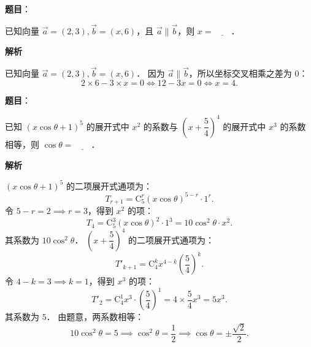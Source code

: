 \begin{answer}

\textbf{题目}：

已知向量 $\vec{a} = (2, 3), \vec{b} = (x, 6)$，且 $\vec{a} \parallel \vec{b}$，则 $x = \underline{\qquad}$．

\textbf{解析}

已知向量 $\vec{a} = (2, 3), \vec{b} = (x, 6)$．
因为 $\vec{a} \parallel \vec{b}$，所以坐标交叉相乘之差为 0：
\nopagebreak[4]
\[
2 \times 6 - 3 \times x = 0 \iff 12 - 3x = 0 \iff x = 4.
\]


\end{answer}
\begin{answer}

\textbf{题目}：

已知 $(x\cos\theta + 1)^5$ 的展开式中 $x^2$ 的系数与 $\left(x + \dfrac{5}{4}\right)^4$ 的展开式中 $x^3$ 的系数相等，则 $\cos\theta = \underline{\qquad}$．

\textbf{解析}

$(x\cos\theta + 1)^5$ 的二项展开式通项为：
\nopagebreak[4]
\[
T_{r+1} = \mathrm{C}_5^r (x\cos\theta)^{5-r} \cdot 1^r.
\]
令 $5 - r = 2 \implies r = 3$，得到 $x^2$ 的项：
\nopagebreak[4]
\[
T_4 = \mathrm{C}_5^3 (x\cos\theta)^2 \cdot 1^3 = 10 \cos^2\theta \cdot x^2.
\]
其系数为 $10\cos^2\theta$．
$\left(x + \dfrac{5}{4}\right)^4$ 的二项展开式通项为：
\nopagebreak[4]
\[
T'_{k+1} = \mathrm{C}_4^k x^{4-k} \left(\frac{5}{4}\right)^k.
\]
令 $4 - k = 3 \implies k = 1$，得到 $x^3$ 的项：
\nopagebreak[4]
\[
T'_2 = \mathrm{C}_4^1 x^3 \cdot \left(\frac{5}{4}\right)^1 = 4 \times \frac{5}{4} x^3 = 5 x^3.
\]
其系数为 $5$．
由题意，两系数相等：
\nopagebreak[4]
\[
10\cos^2\theta = 5 \implies \cos^2\theta = \frac{1}{2} \implies \cos\theta = \pm \frac{\sqrt{2}}{2}.
\]


\end{answer}
